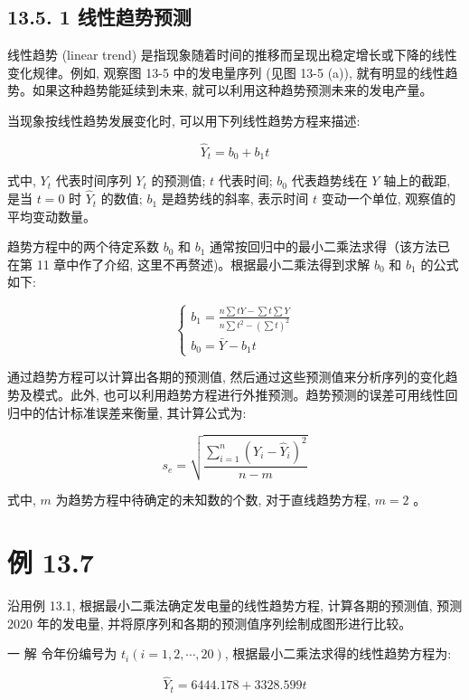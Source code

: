 \documentclass[10pt]{article}
\begin{document}
\begin{CJK*}{UTF8}{bsmi}
\subsection*{13.5. 1 线性趋势预测}
线性趋势 (linear trend) 是指现象随着时间的推移而呈现出稳定增长或下降的线性变化规律。例如, 观察图 13-5 中的发电量序列 (见图 13-5 (a)), 就有明显的线性趋势。如果这种趋势能延续到未来, 就可以利用这种趋势预测未来的发电产量。

当现象按线性趋势发展变化时, 可以用下列线性趋势方程来描述:


\begin{equation*}
\hat{Y}_{t}=b_{0}+b_{1} t \tag{13.19}
\end{equation*}


式中, $Y_{t}$ 代表时间序列 $Y_{t}$ 的预测值; $t$ 代表时间; $b_{0}$ 代表趋势线在 $Y$ 轴上的截距, 是当 $t=0$ 时 $\hat{Y}_{t}$ 的数值; $b_{1}$ 是趋势线的斜率, 表示时间 $t$ 变动一个单位, 观察值的平均变动数量。

趋势方程中的两个待定系数 $b_{0}$ 和 $b_{1}$ 通常按回归中的最小二乘法求得（该方法已在第 11 章中作了介绍, 这里不再赘述)。根据最小二乘法得到求解 $b_{0}$ 和 $b_{1}$ 的公式如下:

\[
\left\{\begin{array}{l}
b_{1}=\frac{n \sum t Y-\sum t \sum Y}{n \sum t^{2}-\left(\sum t\right)^{2}}  \tag{13.20}\\
b_{0}=\bar{Y}-b_{1} t
\end{array}\right.
\]

通过趋势方程可以计算出各期的预测值, 然后通过这些预测值来分析序列的变化趋势及模式。此外, 也可以利用趋势方程进行外推预测。趋势预测的误差可用线性回归中的估计标准误差来衡量, 其计算公式为:


\begin{equation*}
s_{e}=\sqrt{\frac{\sum_{i=1}^{n}\left(Y_{i}-\hat{Y}_{i}\right)^{2}}{n-m}} \tag{13.21}
\end{equation*}


式中, $m$ 为趋势方程中待确定的未知数的个数, 对于直线趋势方程, $m=2$ 。

\section*{例 13.7}
沿用例 13.1, 根据最小二乘法确定发电量的线性趋势方程, 计算各期的预测值, 预测 2020 年的发电量, 并将原序列和各期的预测值序列绘制成图形进行比较。

一 解 令年份编号为 $t_{i}(i=1,2, \cdots, 20)$, 根据最小二乘法求得的线性趋势方程为:

$$
\hat{Y}_{t}=6444.178+3328.599 t
$$


\end{CJK*}
\end{document}
